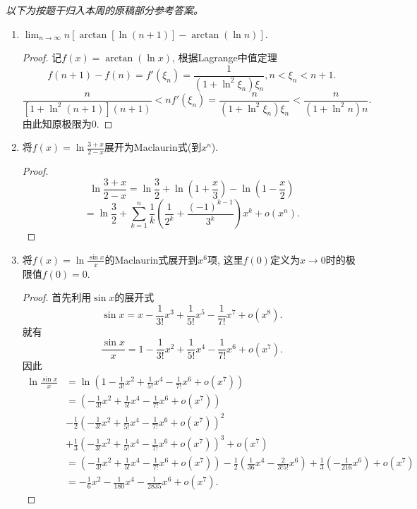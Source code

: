 \documentclass[UTF8,11pt, a4paper, oneside, fontset=none]{ctexbook}
\begin{document}
\noindent\emph{以下为按题干归入本周的原稿部分参考答案。}

\begin{enumerate}
\item $\lim_{n \to \infty} n[\arctan[\ln(n+1)] - \arctan (\ln n)]$.

\begin{proof}

记$f(x) = \arctan (\ln x)$, 根据Lagrange中值定理
\[
f(n+1) - f(n) = f'(\xi_n) = \frac{1}{(1 + \ln^2 \xi_n) \xi_n}, n < \xi_n < n+1.
\]
\[
\frac{n}{[1 + \ln^2(n+1)](n+1)} < n f'(\xi_n) = \frac{n}{(1 + \ln^2 \xi_n) \xi_n} < \frac{n}{(1 + \ln^2 n) n}.
\]
由此知原极限为0.

\end{proof}


\item 将$f(x) = \ln \frac{3+x}{2-x}$展开为Maclaurin式(到$x^n$).

\begin{proof}
\[
\ln \frac{3+x}{2-x} = \ln \frac{3}{2} + \ln (1 + \frac{x}{3}) - \ln (1 - \frac{x}{2})
\]
\[
=  \ln \frac{3}{2} + \sum_{k=1}^n \frac{1}{k} \left( \frac{1}{2^k} + \frac{(-1)^{k-1}}{3^k} \right)x^k + o(x^n).
\]
\end{proof}


\item 将$f(x) = \ln \frac{\sin x}{x}$的Maclaurin式展开到$x^6$项, 这里$f(0)$定义为$x \to 0$时的极限值$f(0) = 0$.

\begin{proof}

首先利用$\sin x$的展开式
\[
\sin x = x - \frac{1}{3!}x^3 + \frac{1}{5!}x^5 - \frac{1}{7!} x^7 + o (x^8).
\]
就有
\[
\frac{\sin x}{x} = 1 - \frac{1}{3!}x^2 + \frac{1}{5!}x^4 - \frac{1}{7!} x^6 + o (x^7).
\]
因此
\begin{align*}
\ln \frac{\sin x}{x} & = \ln \left(1 - \frac{1}{3!}x^2 + \frac{1}{5!}x^4 - \frac{1}{7!} x^6 + o (x^7) \right)\\
& = \left(- \frac{1}{3!}x^2 + \frac{1}{5!}x^4 - \frac{1}{7!} x^6 + o (x^7) \right)\\
& - \frac{1}{2} \left(- \frac{1}{3!}x^2 + \frac{1}{5!}x^4 - \frac{1}{7!} x^6 + o (x^7) \right)^2 \\
& + \frac{1}{3} \left(- \frac{1}{3!}x^2 + \frac{1}{5!}x^4 - \frac{1}{7!} x^6 + o (x^7) \right)^3 + o(x^7)\\
& =  \left(- \frac{1}{3!}x^2 + \frac{1}{5!}x^4 - \frac{1}{7!} x^6 + o (x^7) \right) - \frac{1}{2} \left(\frac{1}{36} x^4 - \frac{2}{3! 5!}x^6 \right) + \frac{1}{3} \left( - \frac{1}{216} x^6 \right) + o(x^7) \\
& = -\frac{1}{6}x^2 - \frac{1}{180}x^4 - \frac{1}{2835}x^6 + o(x^7).
\end{align*}


\end{proof}
\end{enumerate}
\end{document}
